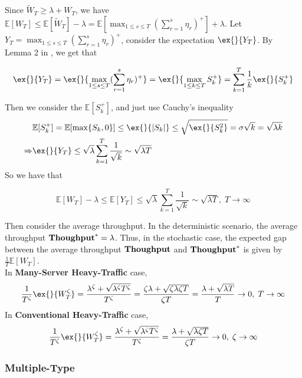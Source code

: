 Since $\tilde{W}_T \geq \lambda+W_T$, we have $\mathbb{E}[W_T]\leq \mathbb{E}[\tilde{W}_T]-\lambda = \mathbb{E}[\max_{1\leq s\leq T}(\sum_{r=1}^{s}\eta_r)^+]+\lambda$. Let $Y_T = \max_{1\leq s\leq T}(\sum_{r=1}^{s}\eta_r)^+$, consider the expectation $\ex{}{Y_T}$.
By Lemma 2 in \cite{strait1974maximum}, we get that
\begin{lemma}\label{lem:Y_T}
    $$\ex{}{Y_T}=\ex{}{\max_{1\leq s\leq T}(\sum_{r=1}^s\eta_r)^+}=\ex{}{\max_{1\leq k\leq T}S_k^+}=\sum_{k=1}^T \frac{1}{k}\ex{}{S_k^+}$$
\end{lemma}
Then we consider the $\mathbb{E}[S_k^+]$, and just use Cauchy's inequality
\begin{align*}
&\mathbb{E}[S_k^+]=\mathbb{E}[\max\{S_k,0\}]\leq \ex{}{|S_k|}\leq \sqrt{\ex{}{S_k^2}}=\sigma\sqrt{k}=\sqrt{\lambda k}\\
\Rightarrow& \ex{}{Y_T}\leq \sqrt{\lambda}\sum_{k=1}^T \frac{1}{\sqrt{k}} \sim \sqrt{\lambda T}
\end{align*}
So we have that 
\begin{lemma}\label{lemma::throughput gap}
    $$\mathbb{E}[W_T]-\lambda\leq \mathbb{E}[Y_T]\leq  \sqrt{\lambda} \sum_{k=1}^T \frac{1}{\sqrt{k}} \sim\sqrt{\lambda T},\; T\to \infty$$
\end{lemma}
Then consider the average throughput. In the deterministic scenario, the average throughput $\textbf{Thoughput}^* = \lambda$. Thus, in the stochastic case, the expected gap between the average throughput $\textbf{Thoughput}$ and $\textbf{Thoughput}^*$ is given by $\frac{1}{T}\mathbb{E}[W_T]$.\\
In \textbf{Many-Server Heavy-Traffic} case, 
\begin{align*}
    \frac{1}{T^{\zeta}}\ex{}{W_T^{\zeta}}=\frac{\lambda^{\zeta}+\sqrt{\lambda^{\zeta}T^{\zeta}}}{T^{\zeta}}=\frac{\zeta\lambda+\sqrt{\zeta\lambda \zeta T }}{\zeta T}=\frac{\lambda+\sqrt{\lambda T}}{T}\to 0,\; T\to \infty
\end{align*}
In \textbf{Conventional Heavy-Traffic} case, 
\begin{align*}
    \frac{1}{T^{\zeta}}\ex{}{W_T^{\zeta}}=\frac{\lambda^{\zeta}+\sqrt{\lambda^{\zeta}T^{\zeta}}}{T^{\zeta}}=\frac{\lambda+\sqrt{\lambda \zeta T }}{\zeta T}\to 0,\; \zeta\to \infty 
\end{align*}

\subsubsection{Multiple-Type}

